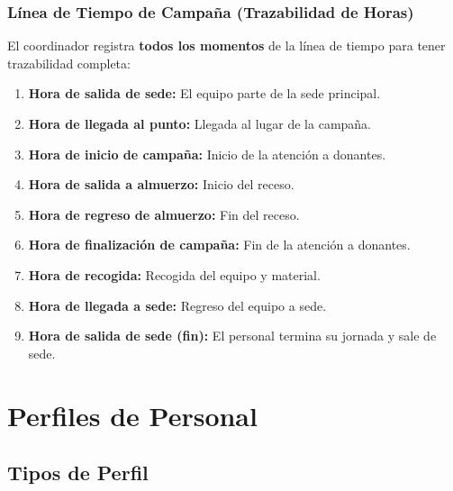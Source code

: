 \documentclass[9pt,a4paper]{extarticle}
\begin{document}
\subsubsection{L\'{i}nea de Tiempo de Campaña (Trazabilidad de Horas)}

El coordinador registra \textbf{todos los momentos} de la l\'{i}nea de tiempo para tener trazabilidad completa:

\begin{enumerate}[leftmargin=2em]
    \item \textbf{Hora de salida de sede:} El equipo parte de la sede principal.
    \item \textbf{Hora de llegada al punto:} Llegada al lugar de la campaña.
    \item \textbf{Hora de inicio de campaña:} Inicio de la atenci\'{o}n a donantes.
    \item \textbf{Hora de salida a almuerzo:} Inicio del receso.
    \item \textbf{Hora de regreso de almuerzo:} Fin del receso.
    \item \textbf{Hora de finalizaci\'{o}n de campaña:} Fin de la atenci\'{o}n a donantes.
    \item \textbf{Hora de recogida:} Recogida del equipo y material.
    \item \textbf{Hora de llegada a sede:} Regreso del equipo a sede.
    \item \textbf{Hora de salida de sede (fin):} El personal termina su jornada y sale de sede.
\end{enumerate}

\newpage
\section{Perfiles de Personal}

\subsection{Tipos de Perfil}
\end{document}

